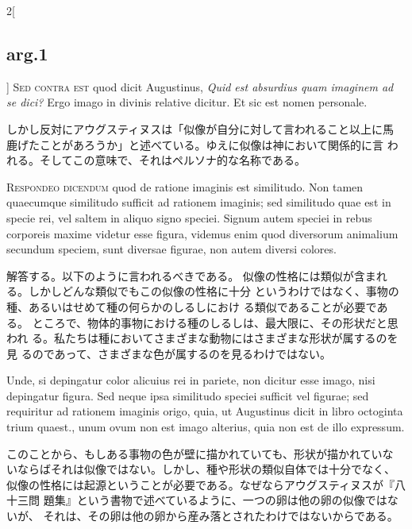 \documentclass[paper=a4paper,fontsize=10pt,jafontsize=9pt,titlepage]{jlreq}
\begin{document}
\begin{paracol}{2}[\subsection{arg.1}]
{\scshape Sed contra est} quod dicit Augustinus, {\itshape Quid est absurdius quam imaginem
ad se dici?} Ergo imago in divinis relative dicitur. Et sic est nomen
personale.

\switchcolumn

しかし反対にアウグスティヌスは「似像が自分に対して言われること以上に馬
 鹿げたことがあろうか」と述べている。ゆえに似像は神において関係的に言
 われる。そしてこの意味で、それはペルソナ的な名称である。


{\scshape Respondeo dicendum} quod de ratione imaginis est similitudo. Non tamen
quaecumque similitudo sufficit ad rationem imaginis; sed similitudo
quae est in specie rei, vel saltem in aliquo signo speciei. Signum
autem speciei in rebus corporeis maxime videtur esse figura, videmus
enim quod diversorum animalium secundum speciem, sunt diversae
figurae, non autem diversi colores.

\switchcolumn

解答する。以下のように言われるべきである。
似像の性格には類似が含まれる。しかしどんな類似でもこの似像の性格に十分
 というわけではなく、事物の種、あるいはせめて種の何らかのしるしにおけ
 る類似であることが必要である。
ところで、物体的事物における種のしるしは、最大限に、その形状だと思われ
 る。私たちは種においてさまざまな動物にはさまざまな形状が属するのを見
 るのであって、さまざまな色が属するのを見るわけではない。

\switchcolumn*

Unde, si depingatur color alicuius
rei in pariete, non dicitur esse imago, nisi depingatur figura. Sed
neque ipsa similitudo speciei sufficit vel figurae; sed requiritur ad
rationem imaginis origo, quia, ut Augustinus dicit in libro octoginta
trium quaest., unum ovum non est imago alterius, quia non est de illo
expressum.

\switchcolumn

このことから、もしある事物の色が壁に描かれていても、形状が描かれていな
 いならばそれは似像ではない。しかし、種や形状の類似自体では十分でなく、
 似像の性格には起源ということが必要である。なぜならアウグスティヌスが『八十三問
 題集』という書物で述べているように、一つの卵は他の卵の似像ではないが、
 それは、その卵は他の卵から産み落とされたわけではないからである。

\switchcolumn*


\end{paracol}
\end{document}
